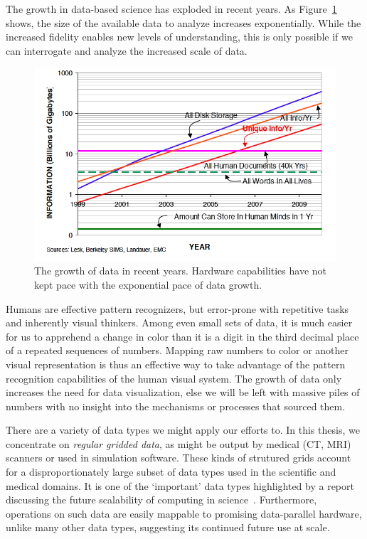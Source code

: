 
The growth in data-based science has exploded in recent years.  As
Figure~\ref{fig:growth} shows, the size of the available data to
analyze increases exponentially.  While the increased fidelity
enables new levels of understanding, this is only possible if we can
interrogate and analyze the increased scale of data.

\begin{figure}
	\includegraphics[width=\linewidth]{images/growth}

  \caption{The growth of data in recent years.  Hardware capabilities
  have not kept pace with the exponential pace of data growth.}

	\label{fig:growth}
\end{figure}

Humans are effective pattern recognizers, but error-prone with
repetitive tasks and inherently visual thinkers.  Among even small sets
of data, it is much easier for us to apprehend a change in color than
it is a digit in the third decimal place of a repeated sequences of
numbers.  Mapping raw numbers to color or another visual representation
is thus an effective way to take advantage of the pattern recognition
capabilities of the human visual system.  The growth of data only
increases the need for data visualization, else we will be left with
massive piles of numbers with no insight into the mechanisms or
processes that sourced them.

There are a variety of data types we might apply our efforts to.  In
this thesis, we concentrate on \textit{regular gridded data}, as might
be output by medical (CT, MRI) scanners or used in simulation software.
These kinds of strutured grids account for a disproportionately large
subset of data types used in the scientific and medical domains.  It is
one of the `important' data types highlighted by a report discussing
the future scalability of computing in
science~\cite{Berkeley:2006:View}.  Furthermore, operations on such
data are easily mappable to promising data-parallel hardware, unlike
many other data types, suggesting its continued future use at scale.

